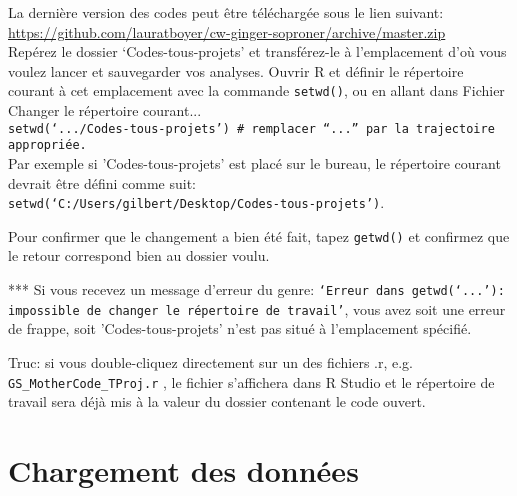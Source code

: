 \documentclass{article}
\newcommand{\mcode} {\texttt{GS\_MotherCode\_TProj.r}{ }}
\begin{document}
La dernière version des codes peut être téléchargée sous le lien
suivant:\\

\url{https://github.com/lauratboyer/cw-ginger-soproner/archive/master.zip}\\

Repérez le dossier `Codes-tous-projets' et transférez-le à l'emplacement d'où vous
voulez lancer et sauvegarder vos analyses. Ouvrir
R et définir le répertoire courant à cet emplacement avec la commande
\texttt{setwd()}, ou en allant dans Fichier \ra Changer le répertoire
courant...\\

\texttt{setwd(`.../Codes-tous-projets') \# remplacer ``...''
par la trajectoire appropriée.}\\

Par exemple si
'Codes-tous-projets' est placé sur le bureau, le répertoire courant
devrait être défini comme suit:\\
\texttt{setwd(`C:/Users/gilbert/Desktop/Codes-tous-projets')}.

Pour confirmer que le changement a bien été fait, tapez
\texttt{getwd()} et confirmez que le retour correspond bien au dossier
voulu.

*** Si vous recevez un message d'erreur du genre:
\texttt{`Erreur dans getwd(`...'): impossible de changer le répertoire
  de travail'}, vous avez soit une erreur de frappe, soit
'Codes-tous-projets' n'est pas situé à l'emplacement spécifié.

Truc: si vous double-cliquez directement sur un des fichiers .r,
e.g. \mcode, le fichier s'affichera dans R
Studio et le répertoire de travail sera déjà mis à la valeur du
dossier contenant le code ouvert.

\section{Chargement des données}
\end{document}
